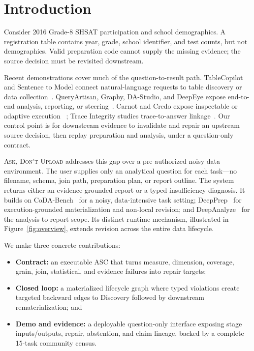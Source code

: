 \documentclass[sigconf, nonacm]{acmart}
\newcommand{\systemname}{\textsc{Ask, Don't Upload}}
\begin{document}
\section{Introduction}

Consider 2016 Grade-8 SHSAT participation and school demographics.  A registration
table contains year, grade, school identifier, and test counts, but not
demographics.  Valid preparation code cannot supply the missing evidence;
the source decision must be revisited downstream.

Recent demonstrations cover much of the question-to-result path. TableCopilot
and Sentence to Model connect natural-language requests to table discovery or
data collection~\cite{cui2025tablecopilot,einy2025sentence}. QueryArtisan,
Graphy, DA-Studio, and DeepEye expose end-to-end analysis, reporting, or
steering~\cite{liu2025queryartisan,lai2025graphy,liu2026dastudio,li2026deepeye}.
Carnot and Credo expose inspectable or adaptive execution
~\cite{russo2026carnot,lu2026credo}; Trace Integrity studies trace-to-answer
linkage~\cite{dutta2026trace}. Our control point is for downstream evidence to invalidate and
repair an upstream source decision, then replay preparation and analysis, under
a question-only contract.

\systemname{} addresses this gap over a pre-authorized noisy data
environment.  The user supplies only an analytical question for each task---no
filename, schema, join path, preparation plan, or report outline.  The system
returns either an evidence-grounded report or a typed insufficiency diagnosis.
It builds on CoDA-Bench~\cite{zhang2026codabench} for a noisy, data-intensive
task setting; DeepPrep~\cite{fan2026deepprep} for execution-grounded
materialization and non-local revision; and DeepAnalyze~
\cite{zhang2025deepanalyze} for the analysis-to-report scope.  Its distinct
runtime mechanism, illustrated in Figure~\ref{fig:overview}, extends revision
across the entire data lifecycle.

We make three concrete contributions:

\begin{itemize}
  \item \textbf{Contract:} an executable ASC that turns measure, dimension,
  coverage, grain, join, statistical, and evidence failures into repair targets;
  \item \textbf{Closed loop:} a materialized lifecycle graph where typed
  violations create targeted backward edges to Discovery followed by downstream
  rematerialization; and
  \item \textbf{Demo and evidence:} a deployable question-only interface
  exposing stage inputs/outputs, repair, abstention, and claim lineage,
  backed by a complete 15-task community census.
\end{itemize}
\end{document}
